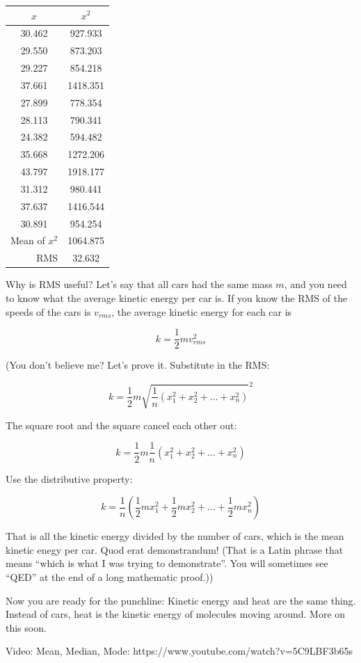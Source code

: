 \begin{tabular}{c |  c}
  $x$ & $x^2$ \\
  \hline
30.462 & 927.933 \\
29.550 & 873.203\\
29.227 & 854.218\\
37.661 & 1418.351\\
27.899 & 778.354\\
28.113 & 790.341\\
24.382 & 594.482\\
35.668 & 1272.206\\
43.797 & 1918.177\\
31.312 & 980.441\\
37.637 & 1416.544\\
30.891 & 954.254\\
\hline
\multicolumn{1}{r}{Mean of $x^2$} & {1064.875}\\
\multicolumn{1}{r}{RMS} & {32.632}
  \end{tabular}

Why is RMS useful? Let's say that all cars had the same mass $m$, and
you need to know what the average kinetic energy per car is. If you
know the RMS of the speeds of the cars is $v_{rms}$, the average kinetic energy for
each car is

$$k = \frac{1}{2}m v_{rms}^2$$

(You don't believe me? Let's prove it. Substitute in the RMS:

$$k = \frac{1}{2}m \sqrt{\frac{1}{n}\left( x_1^2 + x_2^2 + \ldots + x_n^2 \right)}^2$$

The square root and the square cancel each other out:

$$k = \frac{1}{2}m \frac{1}{n}\left( x_1^2 + x_2^2 + \ldots + x_n^2 \right)$$

Use the distributive property:

$$k = \frac{1}{n} \left( \frac{1}{2} m x_1^2 + \frac{1}{2}m x_2^2 + \ldots + \frac{1}{2}m x_n^2 \right)$$


That is all the kinetic energy divided by the number of cars, which is
the mean kinetic enegy per car. Quod erat demonstrandum! (That is a
Latin phrase that means ``which is what I was trying to
demonstrate''. You will sometimes see ``QED'' at the end of a long
mathematic proof.))

Now you are ready for the punchline: Kinetic energy and heat are the
same thing. Instead of cars, heat is the kinetic energy of molecules
moving around. More on this soon.

Video: Mean, Median, Mode: https://www.youtube.com/watch?v=5C9LBF3b65s


